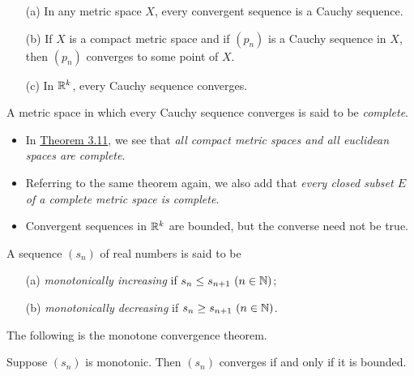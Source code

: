 \documentclass[11pt,a4paper]{book}
\begin{document}
\begin{theorem}[3.11]\label{Theorem 3.11}
    \begin{enumerate}
        \item[(a)] In any metric space \( X  \), every convergent sequence is a Cauchy sequence.
        \item[(b)] If \( X  \) is a compact metric space and if \( ({p}_{n}) \) is a Cauchy sequence in \( X  \), then \( ({p}_{n}) \) converges to some point of \( X  \).
        \item[(c)] In \( \mathbb{R}^{k } \), every Cauchy sequence converges.
    \end{enumerate}
\end{theorem}

\begin{definition}[3.12]
   A metric space in which every Cauchy sequence converges is said to be \textit{complete}. \end{definition}

\begin{itemize}
    \item In {\hyperref[Theorem 3.11]{Theorem 3.11}}, we see that \textit{all compact metric spaces and all euclidean spaces are complete}. 
    \item Referring to the same theorem again, we also add that \textit{every closed subset \( E  \) of a complete metric space is complete}.
    \item Convergent sequences in \( \mathbb{R}^{k} \) are bounded, but the converse need not be true.
\end{itemize}

\begin{definition}[3.13]
    A sequence \( ({s}_{n}) \) of real numbers is said to be 
    \begin{enumerate}
        \item[(a)] \textit{monotonically increasing} if \( {s}_{n} \leq {s}_{n+1} \ (n \in \N) \);
        \item[(b)] \textit{monotonically decreasing} if \( {s}_{n} \geq {s}_{n+1} \ (n \in \N) \).
    \end{enumerate}
\end{definition}

The following is the monotone convergence theorem.

\begin{theorem}[3.14]
    Suppose \( ({s}_{n}) \) is monotonic. Then \( ({s}_{n}) \) converges if and only if it is bounded.
\end{theorem}
\end{document}
